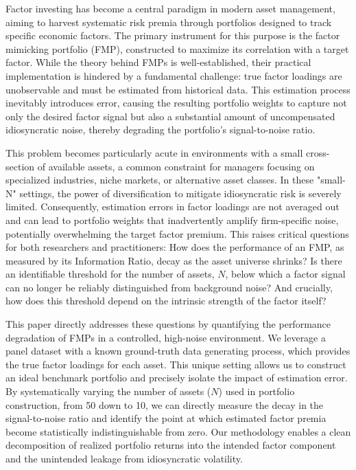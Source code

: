 \documentclass[]{article}
\begin{document}
Factor investing has become a central paradigm in modern asset management, aiming to harvest systematic risk premia through portfolios designed to track specific economic factors. The primary instrument for this purpose is the factor mimicking portfolio (FMP), constructed to maximize its correlation with a target factor. While the theory behind FMPs is well-established, their practical implementation is hindered by a fundamental challenge: true factor loadings are unobservable and must be estimated from historical data. This estimation process inevitably introduces error, causing the resulting portfolio weights to capture not only the desired factor signal but also a substantial amount of uncompensated idiosyncratic noise, thereby degrading the portfolio's signal-to-noise ratio.

This problem becomes particularly acute in environments with a small cross-section of available assets, a common constraint for managers focusing on specialized industries, niche markets, or alternative asset classes. In these "small-N" settings, the power of diversification to mitigate idiosyncratic risk is severely limited. Consequently, estimation errors in factor loadings are not averaged out and can lead to portfolio weights that inadvertently amplify firm-specific noise, potentially overwhelming the target factor premium. This raises critical questions for both researchers and practitioners: How does the performance of an FMP, as measured by its Information Ratio, decay as the asset universe shrinks? Is there an identifiable threshold for the number of assets, $N$, below which a factor signal can no longer be reliably distinguished from background noise? And crucially, how does this threshold depend on the intrinsic strength of the factor itself?

This paper directly addresses these questions by quantifying the performance degradation of FMPs in a controlled, high-noise environment. We leverage a panel dataset with a known ground-truth data generating process, which provides the true factor loadings for each asset. This unique setting allows us to construct an ideal benchmark portfolio and precisely isolate the impact of estimation error. By systematically varying the number of assets ($N$) used in portfolio construction, from 50 down to 10, we can directly measure the decay in the signal-to-noise ratio and identify the point at which estimated factor premia become statistically indistinguishable from zero. Our methodology enables a clean decomposition of realized portfolio returns into the intended factor component and the unintended leakage from idiosyncratic volatility.
\end{document}
